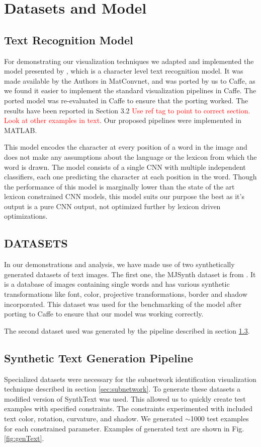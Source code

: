 \documentclass[10pt,twocolumn,letterpaper]{article}
\begin{document}
\section{Datasets and Model}


\subsection{Text Recognition Model}
For demonstrating our visualization techniques we adapted and implemented the model presented by \cite{Jaderberg14c}, which is a character level text recognition model. It was made available by the Authors in MatConvnet, and was ported by us to Caffe, as we found it easier to implement the standard visualization pipelines in Caffe. The ported model was re-evaluated in Caffe to ensure that the porting worked. The results have been reported in Section 3.2 \textcolor{red}{Use ref tag to point to correct section. Look at other examples in text}. Our proposed pipelines were implemented in MATLAB.


This model encodes the character at every position of a word in the image and does not make any assumptions about the language or the lexicon from which the word is drawn. The model consists of a single CNN with multiple independent classifiers, each one predicting the character at each position in the word. Though the performance of this model is marginally lower than the state of the art lexicon constrained CNN models, this model suits our purpose the best as it's output is a pure CNN output, not optimized further by lexicon driven optimizations. 


\subsection{DATASETS}
In our demonstrations and analysis, we have made use of two synthetically generated datasets of text images. The first one, the MJSynth dataset is from \cite{Jaderberg14c}. It is a database of images containing single words and has various synthetic transformations like font, color, projective transformations, border and shadow incorporated. This dataset was used for the benchmarking of the model after porting to Caffe to ensure that our model was working correctly.


The second dataset used was generated by the pipeline described in section \ref{sec:synthtext}.

\subsection{Synthetic Text Generation Pipeline} \label{sec:synthtext}
Specialized datasets were necessary for the subnetwork identification visualization technique described in section \ref{sec:subnetwork}.
To generate these datasets a modified version of SynthText \cite{Gupta16} was used. This allowed us to quickly create test examples with specified constraints. The constraints experimented with included text color, rotation, curvature, and shadow. We generated  $\sim$1000 test examples for each constrained parameter. Examples of generated text are shown in Fig. \ref{fig:genText}.
\end{document}
